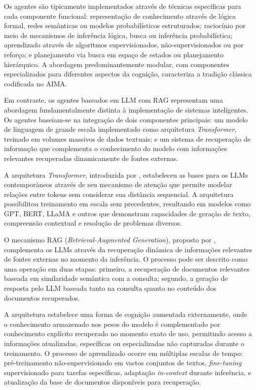 \documentclass[12pt]{article}
\begin{document}
Os agentes são tipicamente implementados através de técnicas específicas para cada componente funcional: representação de conhecimento através de lógica formal, redes semânticas ou modelos probabilísticos estruturados; raciocínio por meio de mecanismos de inferência lógica, busca ou inferência probabilística; aprendizado através de algoritmos supervisionados, não-supervisionados ou por reforço; e planejamento via busca em espaço de estados ou planejamento hierárquico. A abordagem predominantemente modular, com componentes especializados para diferentes aspectos da cognição, caracteriza a tradição clássica codificada no AIMA.

Em contraste, os agentes baseados em LLM com RAG representam uma abordagem fundamentalmente distinta à implementação de sistemas inteligentes. Os agentes baseiam-se na integração de dois componentes principais: um modelo de linguagem de grande escala implementado como arquitetura \textit{Transformer}, treinado em volumes massivos de dados textuais; e um sistema de recuperação de informação que complementa o conhecimento do modelo com informações relevantes recuperadas dinamicamente de fontes externas.

A arquitetura \textit{Transformer}, introduzida por \citet{vaswani2017attention}, estabeleceu as bases para os LLMs contemporâneos através de seu mecanismo de atenção que permite modelar relações entre tokens sem considerar sua distância sequencial. A arquitetura possibilitou treinamento em escala sem precedentes, resultando em modelos como GPT, BERT, LLaMA e outros que demonstram capacidades de geração de texto, compreensão contextual e resolução de problemas diversos.

O mecanismo RAG (\textit{Retrieval-Augmented Generation}), proposto por \citet{lewis2020retrieval}, complementa os LLMs através da recuperação dinâmica de informações relevantes de fontes externas no momento da inferência. O processo pode ser descrito como uma operação em duas etapas: primeiro, a recuperação de documentos relevantes baseada em similaridade semântica com a consulta; segundo, a geração de resposta pelo LLM baseada tanto na consulta quanto no conteúdo dos documentos recuperados.

A arquitetura estabelece uma forma de cognição aumentada externamente, onde o conhecimento armazenado nos pesos do modelo é complementado por conhecimento explícito recuperado no momento exato de uso, permitindo acesso a informações atualizadas, específicas ou especializadas não capturadas durante o treinamento. O processo de aprendizado ocorre em múltiplas escalas de tempo: pré-treinamento não-supervisionado em vastos conjuntos de textos, \textit{fine-tuning} supervisionado para tarefas específicas, adaptação \textit{in-context} durante inferência, e atualização da base de documentos disponíveis para recuperação.
\end{document}
